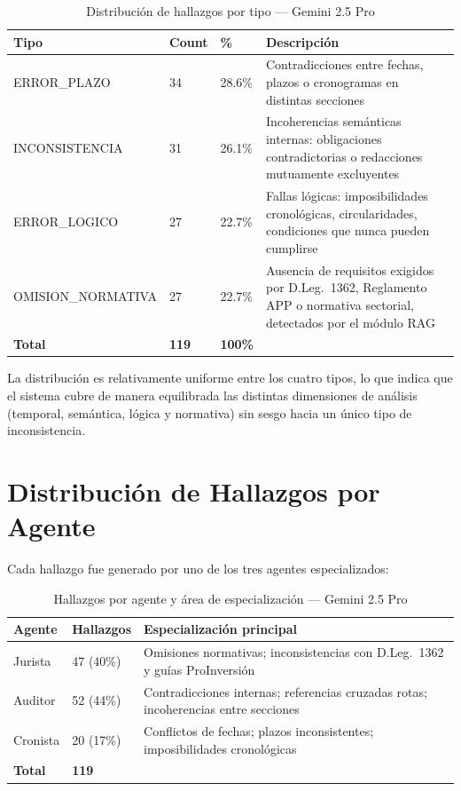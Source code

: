 \begin{table}[H]
\centering
\caption{Distribución de hallazgos por tipo — Gemini 2.5 Pro}
\label{tab:hallazgos_tipo}
\begin{tabular}{p{4cm} p{2cm} p{2cm} p{5cm}}
\toprule
\textbf{Tipo} & \textbf{Count} & \textbf{\%} & \textbf{Descripción} \\
\midrule
ERROR\_PLAZO &
    34 & 28.6\% &
    Contradicciones entre fechas, plazos o cronogramas en distintas secciones \\
INCONSISTENCIA &
    31 & 26.1\% &
    Incoherencias semánticas internas: obligaciones contradictorias o
    redacciones mutuamente excluyentes \\
ERROR\_LOGICO &
    27 & 22.7\% &
    Fallas lógicas: imposibilidades cronológicas, circularidades, condiciones
    que nunca pueden cumplirse \\
OMISION\_NORMATIVA &
    27 & 22.7\% &
    Ausencia de requisitos exigidos por D.Leg.\ 1362, Reglamento APP o
    normativa sectorial, detectados por el módulo RAG \\
\midrule
\textbf{Total} & \textbf{119} & \textbf{100\%} & \\
\bottomrule
\end{tabular}
\end{table}

La distribución es relativamente uniforme entre los cuatro tipos, lo que
indica que el sistema cubre de manera equilibrada las distintas dimensiones
de análisis (temporal, semántica, lógica y normativa) sin sesgo hacia un
único tipo de inconsistencia.

\section*{Distribución de Hallazgos por Agente}

Cada hallazgo fue generado por uno de los tres agentes especializados:

\begin{table}[H]
\centering
\caption{Hallazgos por agente y área de especialización — Gemini 2.5 Pro}
\label{tab:hallazgos_agente}
\begin{tabular}{p{2.5cm} p{2cm} p{8cm}}
\toprule
\textbf{Agente} & \textbf{Hallazgos} & \textbf{Especialización principal} \\
\midrule
Jurista  & 47 (40\%) & Omisiones normativas; inconsistencias con D.Leg.\ 1362
                       y guías ProInversión \\
Auditor  & 52 (44\%) & Contradicciones internas; referencias cruzadas rotas;
                       incoherencias entre secciones \\
Cronista & 20 (17\%) & Conflictos de fechas; plazos inconsistentes;
                       imposibilidades cronológicas \\
\midrule
\textbf{Total} & \textbf{119} & \\
\bottomrule
\end{tabular}
\end{table}

